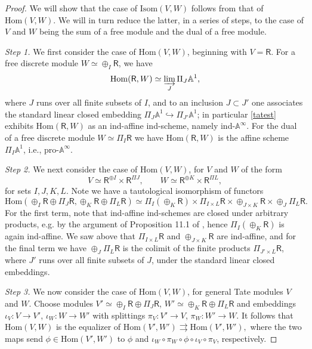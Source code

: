 \documentclass{amsart}
\theoremstyle{definition}
\newcommand{\Hom}{\on{Hom}}
\newcommand{\on}{\mathrm}
\newcommand{\Ring}{\mathsf{R}}
\numberwithin{equation}{section}
\begin{document}
\begin{proof} We will show that the case of $\on{Isom}(V,W)$ follows from that of $\Hom(V,W)$. We will in turn reduce the latter, in a series of steps, to the case of $V$ and $W$ being the sum of a free module and the dual of a free module. 


{\em Step 1.} We first consider the case of $\Hom(V,W)$, beginning with $V = \Ring$. For a free discrete module $W \simeq \oplus_I \Ring$, we have \begin{equation} \label{tatest}\Hom(\Ring,W) \simeq \varinjlim_J \Pi_J \mathbb{A}^1,\end{equation}where $J$ runs over all finite subsets of $I$, and to an inclusion $J \subset J'$ one associates the standard linear closed embedding $\Pi_J \mathbb{A}^1 \hookrightarrow \Pi_{J'} \mathbb{A}^1$; in particular \eqref{tatest} exhibits $\Hom(\Ring, W)$ as an ind-affine ind-scheme, namely ind-$\mathbb{A}^\infty$.
For the dual of a free discrete module $W \simeq \Pi_I \Ring$ we have $\Hom(\Ring,W)$ is the affine scheme $\Pi_I \mathbb{A}^1$, i.e., pro-$\mathbb{A}^\infty$. 

{\em Step 2.} We next consider the case of $\Hom(V,W)$, for $V$ and $W$ of the form $$V \simeq \Ring^{\oplus I} \times \Ring^{\Pi J}, \quad \quad W \simeq \Ring^{\oplus K} \times \Ring^{\Pi L},$$for sets $I,J,K,L$.  Note we have a tautological isomorphism of functors
$$\Hom(\oplus_I \Ring \oplus \Pi_J \Ring, \oplus_K \Ring \oplus \Pi_L \Ring) \simeq \Pi_I (\oplus_K \Ring) \times \Pi_{I \times L} \Ring \times \oplus_{J \times K} \Ring \times \oplus_J \Pi_L \Ring.$$For the first term, note that ind-affine ind-schemes are closed under arbitrary products, e.g. by the argument of Proposition 11.1 of \cite{Isak}, hence $\Pi_I (\oplus_K \Ring)$ is again ind-affine. We saw above that $\Pi_{I \times L} \Ring$ and $\oplus_{J \times K} \Ring$ are ind-affine, and for the final term we have $\oplus_J \Pi_L \Ring$ is the colimit of the finite products $\Pi_{J' \times L} \Ring$, where $J'$ runs over all finite subsets of $J$, under the standard linear closed embeddings. 


{\em Step 3.} We now consider the case of $\Hom(V,W)$, for general Tate modules $V$ and $W$.  Choose modules $V' \simeq \oplus_I \Ring \oplus \Pi_J \Ring$, $W' \simeq \oplus_K \Ring \oplus \Pi_L \Ring$ and embeddings $\iota_V: V \rightarrow V'$, $\iota_W: W \rightarrow W'$ with splittings $\pi_V: V' \rightarrow V$, $\pi_W: W' \rightarrow W$.  It follows that $\Hom(V,W)$ is the equalizer of $\Hom(V', W') \rightrightarrows \Hom(V',W'),$ where the two maps send $\phi \in \Hom(V', W')$ to $\phi$ and $\iota_W \circ \pi_W \circ \phi \circ \iota_V \circ \pi_V$, respectively. 


\end{proof}
\end{document}
